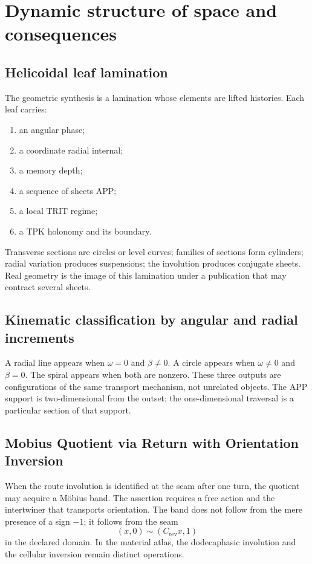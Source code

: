 \chapter{Dynamic structure of space and consequences}

\section{Helicoidal leaf lamination}

The geometric synthesis is a lamination whose elements are lifted
histories. Each leaf carries:
\begin{enumerate}
\item an angular phase;
\item a coordinate radial internal;
\item a memory depth;
\item a sequence of sheets APP;
\item a local TRIT regime;
\item a TPK holonomy and its boundary.
\end{enumerate}
Transverse sections are circles or level curves; families of
sections form cylinders; radial variation produces suspensions; the
involution produces conjugate sheets. Real geometry is the image of this
lamination under a publication that may contract several sheets.

\section{Kinematic classification by angular and radial increments}

A radial line appears when \(\omega=0\) and \(\beta\neq0\). A
circle appears when \(\omega\neq0\) and \(\beta=0\). The spiral
appears when both are nonzero. These three outputs are configurations of
the same transport mechanism, not unrelated objects. The APP support
is two-dimensional from the outset; the one-dimensional traversal is a
particular section of that support.

\section{Mobius Quotient via Return with Orientation Inversion}

When the route involution is identified at the seam after one
turn, the quotient may acquire a Möbius band. The assertion requires
a free action and the intertwiner that transports orientation. The band does not
follow from the mere presence of a sign \(-1\); it follows from the seam
\[
 (x,0)\sim(C_{\mathrm{rev}}x,1)
\]
in the declared domain. In the material atlas, the dodecaphasic involution and
the cellular inversion remain distinct operations.

